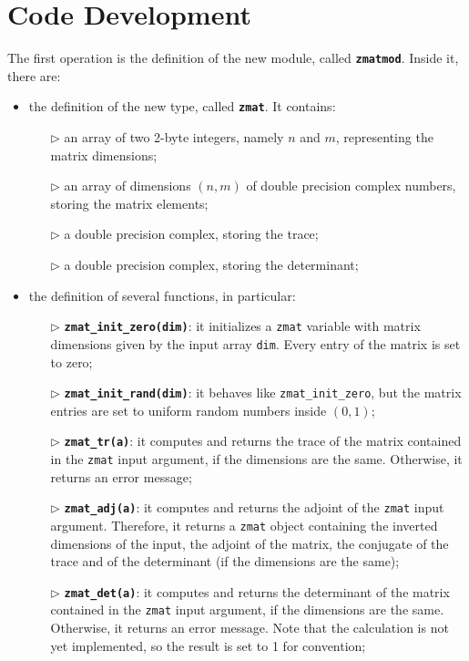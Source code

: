 \documentclass[pra, onecolumn, notitlepage, floats, 11pt]{revtex4-1}
\newcommand{\codebold}[1]{\texttt{\bfseries {\color{cobalt}#1}}}
\newcommand{\code}[1]{\texttt{#1}}
\newcommand{\codefunctionbold}[2]{\texttt{\bfseries {\color{cobalt}#1}({\color{lava}#2})}}
\begin{document}
\section{Code Development}
The first operation is the definition of the new module, called \codebold{zmatmod}. Inside it, there are:
\begin{itemize}
    \item the definition of the new type, called \codebold{zmat}. It contains:
    \begin{itemize}
        \item[\( \triangleright \)] an array of two 2-byte integers, namely \( n \) and \( m \), representing the matrix dimensions;
        \item[\( \triangleright \)] an array of dimensions \( (n,m) \) of double precision complex numbers, storing the matrix elements;
        \item[\( \triangleright \)] a double precision complex, storing the trace;
        \item[\( \triangleright \)] a double precision complex, storing the determinant;
    \end{itemize}

    \item the definition of several functions, in particular:
    \begin{itemize}
        \item[\( \triangleright \)] \codefunctionbold{zmat\_init\_zero}{dim}: it initializes a \code{zmat} variable with matrix dimensions given by the input array \code{dim}. Every entry of the matrix is set to zero;
        \item[\( \triangleright \)] \codefunctionbold{zmat\_init\_rand}{dim}: it behaves like \code{zmat\_init\_zero}, but the matrix entries are set to uniform random numbers inside \( (0,1) \);
        \item[\( \triangleright \)] \codefunctionbold{zmat\_tr}{a}: it computes and returns the trace of the matrix contained in the \code{zmat} input argument, if the dimensions are the same. Otherwise, it returns an error message;
        \item[\( \triangleright \)] \codefunctionbold{zmat\_adj}{a}: it computes and returns the adjoint of the \code{zmat} input argument. Therefore, it returns a \code{zmat} object containing the inverted dimensions of the input, the adjoint of the matrix, the conjugate of the trace and of the determinant (if the dimensions are the same);
        \item[\( \triangleright \)] \codefunctionbold{zmat\_det}{a}: it computes and returns the determinant of the matrix contained in the \code{zmat} input argument, if the dimensions are the same. Otherwise, it returns an error message. Note that the calculation is not yet implemented, so the result is set to 1 for convention;
    \end{itemize}


\end{itemize}
\end{document}
